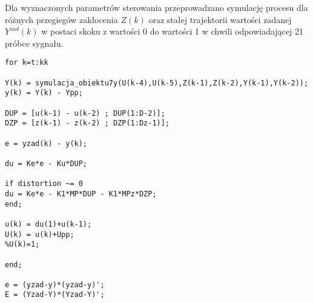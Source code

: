 Dla wyznaczonych parametrów sterowania przeprowadzano symulację procesu dla różnych przegiegów zakłocenia $Z(k)$ oraz stałej trajektorii wartości zadanej $Y^{zad}(k)$ w postaci skoku z wartości 0 do wartości 1 w chwili odpowiadającej 21 próbce sygnału.

\begin{lstlisting}[style=Matlab-editor]
for k=t:kk

Y(k) = symulacja_obiektu7y(U(k-4),U(k-5),Z(k-1),Z(k-2),Y(k-1),Y(k-2));
y(k) = Y(k) - Ypp;

DUP = [u(k-1) - u(k-2) ; DUP(1:D-2)];
DZP = [z(k-1) - z(k-2) ; DZP(1:Dz-1)];

e = yzad(k) - y(k);

du = Ke*e - Ku*DUP;

if distortion ~= 0
du = Ke*e - K1*MP*DUP - K1*MPz*DZP;
end;

u(k) = du(1)+u(k-1);
U(k) = u(k)+Upp;
%U(k)=1;

end;

e = (yzad-y)*(yzad-y)';
E = (Yzad-Y)*(Yzad-Y)';
\end{lstlisting}

